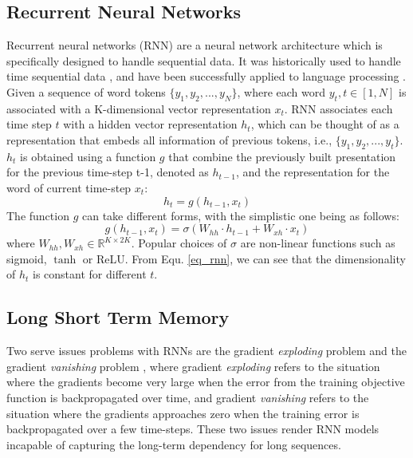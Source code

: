 \subsection{Recurrent Neural Networks}
Recurrent neural networks (RNN) are a neural network architecture which is specifically designed to handle sequential data. It was historically used to handle time sequential data \cite{elman1990finding,funahashi1993approximation}, and have been successfully applied to language processing \cite{mikolov2010recurrent,mikolov2011extensions,mikolov2012statistical,mikolov2012context}.
Given a sequence of word tokens $\{y_1, y_2, ..., y_N\}$, where each word $y_t, t\in [1,N]$ is associated with a K-dimensional vector representation $x_t$.
 RNN associates each time step $t$ with a hidden vector representation $h_t$, which can be thought of as a representation that embeds all information of previous tokens, i.e.,  $\{y_1, y_2, ..., y_{t}\}$. 
$h_t$ is obtained 
using a function $g$
that
 combine the previously built presentation for the previous time-step t-1, denoted as $h_{t-1}$, and the representation for the word of current time-step $x_t$:
\begin{equation}
h_t=g (h_{t-1}, x_t)
\end{equation}
The function $g$ can take different forms, with the simplistic one being as follows:
\begin{equation}
g(h_{t-1},x_t)=\sigma (W_{hh}\cdot h_{t-1}+W_{xh}\cdot x_t)
\label{eq_rnn}
\end{equation}
where $W_{hh}, W_{xh} \in \mathbb{R}^{K\times 2K}$. Popular choices of $\sigma$ are non-linear functions such as sigmoid, $\tanh$ or ReLU. 
From Equ. \ref{eq_rnn}, we can see that the dimensionality of $h_t$ is constant for different $t$. 

\subsection{Long Short Term Memory}
Two serve issues problems with RNNs are the gradient {\it exploding} problem and the gradient {\it vanishing} problem \cite{bengio1994learning}, where gradient {\it exploding}
refers to the situation where the gradients become very large when the error from the training objective function is backpropagated over time, and  gradient {\it vanishing} 
refers to the situation where the gradients approaches zero when the training error is backpropagated over a few time-steps. 
These two issues render RNN models incapable of capturing the long-term dependency for long sequences. 

